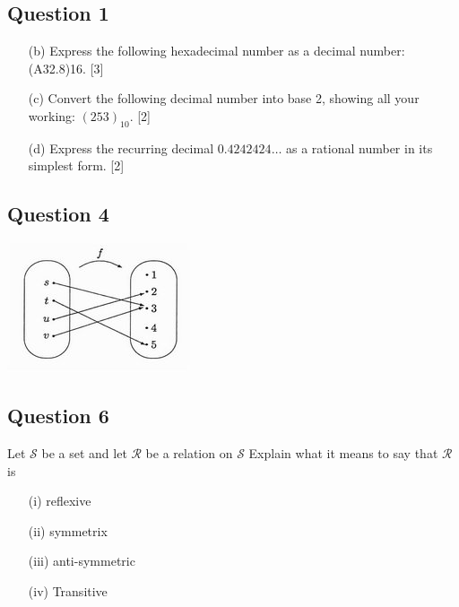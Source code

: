 \documentclass{article}
\begin{document}

\subsection*{Question 1}
\begin{itemize}
	\item[(b)] Express the following hexadecimal number as a decimal number: (A32.8)16.
	[3]
	\item[(c)]  Convert the following decimal number into base 2, showing all your working:
	$(253)_{10}$. [2]
	\item[(d)]  Express the recurring decimal $0.4242424\ldots$
	as a rational number in its simplest
	form. [2]
\end{itemize}
\subsection*{Question 4}
\begin{center}
	\includegraphics[scale=0.55]{HibCollArrow.jpg}
\end{center}

\subsection*{Question 6}
Let $\mathcal{S}$ be a set and let $\mathcal{R}$ be a relation on $\mathcal{S}$
Explain what it means to say that $\mathcal{R}$ is

\begin{itemize}
	\item[(i)] reflexive
	\item[(ii)] symmetrix
	\item[(iii)] anti-symmetric
	\item[(iv)] Transitive
\end{itemize}
\end{document}
